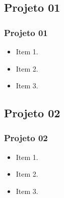 \subsection[Projeto 01]{Projeto 01}\label{subsec:projetos-projeto01}



\begin{frame}[t]\frametitle{Projeto 01}

  \begin{itemize}
    \justifying{}
    \setlength\itemsep{1em}
    \item Item 1.
    \item Item 2.
    \item Item 3.
  \end{itemize}

\end{frame}



\subsection[Projeto 02]{Projeto 02}\label{subsec:projetos-projeto02}



\begin{frame}[t]\frametitle{Projeto 02}
  
  \begin{itemize}
    \justifying{}
    \setlength\itemsep{1em}
    \item Item 1.
    \item Item 2.
    \item Item 3.
  \end{itemize}
  
\end{frame}
